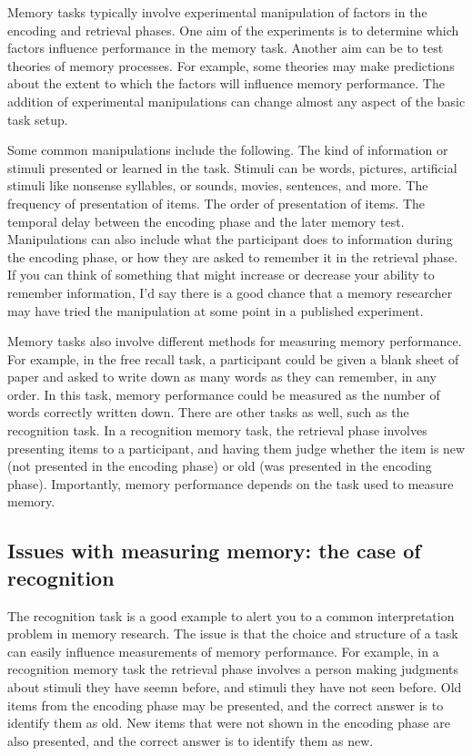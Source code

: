 \documentclass[
  oneside,
  12pt]{crumpbook}
\begin{document}
Memory tasks typically involve experimental manipulation of factors in the encoding and retrieval phases. One aim of the experiments is to determine which factors influence performance in the memory task. Another aim can be to test theories of memory processes. For example, some theories may make predictions about the extent to which the factors will influence memory performance. The addition of experimental manipulations can change almost any aspect of the basic task setup.

Some common manipulations include the following. The kind of information or stimuli presented or learned in the task. Stimuli can be words, pictures, artificial stimuli like nonsense syllables, or sounds, movies, sentences, and more. The frequency of presentation of items. The order of presentation of items. The temporal delay between the encoding phase and the later memory test. Manipulations can also include what the participant does to information during the encoding phase, or how they are asked to remember it in the retrieval phase. If you can think of something that might increase or decrease your ability to remember information, I'd say there is a good chance that a memory researcher may have tried the manipulation at some point in a published experiment.

Memory tasks also involve different methods for measuring memory performance. For example, in the free recall task, a participant could be given a blank sheet of paper and asked to write down as many words as they can remember, in any order. In this task, memory performance could be measured as the number of words correctly written down. There are other tasks as well, such as the recognition task. In a recognition memory task, the retrieval phase involves presenting items to a participant, and having them judge whether the item is new (not presented in the encoding phase) or old (was presented in the encoding phase). Importantly, memory performance depends on the task used to measure memory.

\hypertarget{issues-with-measuring-memory-the-case-of-recognition}{%
\subsection{Issues with measuring memory: the case of recognition}\label{issues-with-measuring-memory-the-case-of-recognition}}

The recognition task is a good example to alert you to a common interpretation problem in memory research. The issue is that the choice and structure of a task can easily influence measurements of memory performance. For example, in a recognition memory task the retrieval phase involves a person making judgments about stimuli they have seemn before, and stimuli they have not seen before. Old items from the encoding phase may be presented, and the correct answer is to identify them as old. New items that were not shown in the encoding phase are also presented, and the correct answer is to identify them as new.
\end{document}
